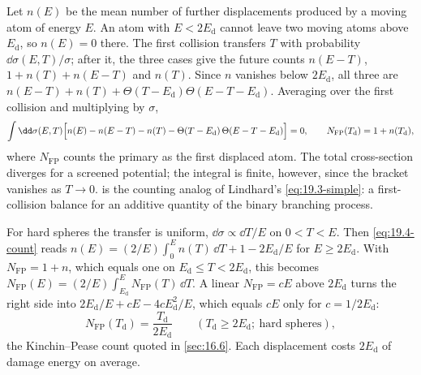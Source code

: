 Let $n(E)$ be the mean number of further displacements produced by a moving atom of energy $E$. An atom with $E < 2E_{\mathrm{d}}$ cannot leave two moving atoms above $E_{\mathrm{d}}$, so $n(E) = 0$ there. The first collision transfers $T$ with probability $\dd\sigma(E,T)/\sigma$; after it, the three cases give the future counts $n(E - T)$, $1 + n(T) + n(E - T)$ and $n(T)$. Since $n$ vanishes below $2E_{\mathrm{d}}$, all three are $n(E - T) + n(T) + \Theta(T - E_{\mathrm{d}})\Theta(E - T - E_{\mathrm{d}})$. Averaging over the first collision and multiplying by $\sigma$,
\begin{equation}
  \int\dd\sigma(E,T)\Bigl[n(E) - n(E - T) - n(T) - \Theta(T - E_{\mathrm{d}})\,\Theta(E - T - E_{\mathrm{d}})\Bigr] = 0 , \qquad
  N_{\mathrm{FP}}(T_{\mathrm{d}}) = 1 + n(T_{\mathrm{d}}) ,
  \label{eq:19.4-count}
\end{equation}
where $N_{\mathrm{FP}}$ counts the primary as the first displaced atom. The total cross-section diverges for a screened potential; the integral is finite, however, since the bracket vanishes as $T \to 0$.  is the counting analog of Lindhard's \cref{eq:19.3-simple}: a first-collision balance for an additive quantity of the binary branching process.

For hard spheres the transfer is uniform, $\dd\sigma \propto \dd T/E$ on $0 < T < E$. Then \cref{eq:19.4-count} reads $n(E) = (2/E)\int_0^En(T)\,\dd T + 1 - 2E_{\mathrm{d}}/E$ for $E \ge 2E_{\mathrm{d}}$. With $N_{\mathrm{FP}} = 1 + n$, which equals one on $E_{\mathrm{d}} \le T < 2E_{\mathrm{d}}$, this becomes $N_{\mathrm{FP}}(E) = (2/E)\int_{E_{\mathrm{d}}}^EN_{\mathrm{FP}}(T)\,\dd T$. A linear $N_{\mathrm{FP}} = cE$ above $2E_{\mathrm{d}}$ turns the right side into $2E_{\mathrm{d}}/E + cE - 4cE_{\mathrm{d}}^2/E$, which equals $cE$ only for $c = 1/2E_{\mathrm{d}}$:
\begin{equation}
  N_{\mathrm{FP}}(T_{\mathrm{d}}) = \frac{T_{\mathrm{d}}}{2E_{\mathrm{d}}} \qquad (T_{\mathrm{d}} \ge 2E_{\mathrm{d}};\ \text{hard spheres}) ,
  \label{eq:19.4-KP}
\end{equation}
the Kinchin--Pease count quoted in \cref{sec:16.6}. Each displacement costs $2E_{\mathrm{d}}$ of damage energy on average.

